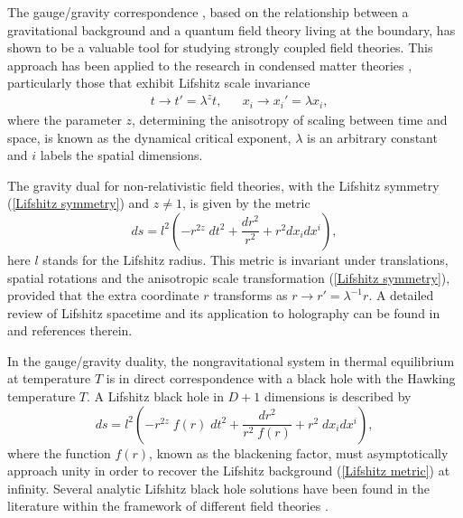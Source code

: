 \documentclass[sn-mathphys,Numbered]{sn-jnl}%
\theoremstyle{thmstyleone}%
\theoremstyle{thmstyletwo}%
\theoremstyle{thmstylethree}%
\begin{document}
         The gauge/gravity correspondence \cite{Maldacena}, based on the relationship between a gravitational background and a quantum field theory living at the boundary, has shown to be a valuable tool for studying strongly coupled field theories. This approach has been applied to the research in  condensed matter theories \cite{Hartnoll1,Hartnoll2,Hartnoll3,Horowitz,Herreras}, particularly those that  exhibit Lifshitz scale invariance 
        \begin{align} \label{Lifshitz symmetry}
            &t\rightarrow t'=\lambda^z t, &
            &x_i\rightarrow x_i'=\lambda x_i,
        \end{align}
        where the parameter $z$, determining the anisotropy of scaling between time and space, is known as the dynamical critical exponent, $\lambda$ is an arbitrary constant and $i$ labels the spatial dimensions. 
        
        The gravity dual for non-relativistic field theories, with the Lifshitz symmetry (\ref{Lifshitz symmetry}) and $z\neq 1$, is given by the metric \cite{Kachru}  
        \begin{equation} \label{Lifshitz metric}
        ds=l^2 \left(-r^{2z}\;dt^{2}+\frac{dr^2}{r^2}+r^{2} dx_i dx^i\right),    
        \end{equation}
          here $l$ stands for the Lifshitz radius. This metric is invariant under translations, spatial rotations and the anisotropic scale transformation (\ref{Lifshitz symmetry}), provided that the extra coordinate $r$ transforms as $r\rightarrow r'=\lambda^{-1} r$. A detailed review of Lifshitz spacetime and its application to holography can be found in \cite{Taylor1,Taylor2} and references therein.
    
        In the gauge/gravity duality, the nongravitational system in thermal equilibrium at temperature $T$  is in direct correspondence with a black hole with the Hawking temperature $T$. A Lifshitz black hole in $D+1$ dimensions
        is described by 
        \begin{equation} \label{}
        ds=l^2 \left(-r^{2z}\;f(r)\;dt^{2}+\frac{dr^2}{r^2\;f(r)}+r^{2} \;dx_i dx^i\right),
        \end{equation}
        where the function $f(r)$, known as the blackening factor, must asymptotically approach unity in order to recover the Lifshitz background (\ref{Lifshitz metric}) at infinity. 
        Several analytic Lifshitz black hole solutions have been found in the literature within the framework of different field theories \cite{Bertoldi,Tarrio,Ayon1,Azeyanagi,Ayon2,Balasubramanian,Korovin,Shu,Pedraza,Herrera Higuita Mendez,Herreras Higuita}.
\end{document}

